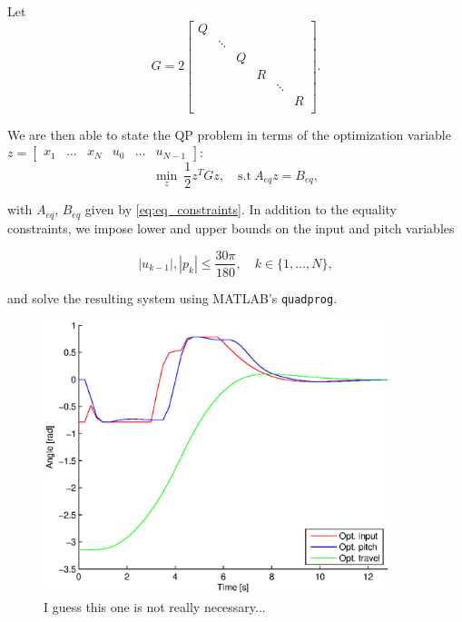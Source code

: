 Let 
\begin{equation*}
	G = 2
	\begin{bmatrix}
	Q	&&&&&		\\
		&\ddots&&&&	\\
		&&Q&&&		\\
		&&&R&&		\\
		&&&&\ddots&	\\
		&&&&&R		\\
	\end{bmatrix}.
\end{equation*}

 We are then able to state the QP problem in terms of the optimization variable $z = \begin{bmatrix} x_1 & \dots & x_N & u_0 & \dots & u_{N-1} \end{bmatrix}$:
\begin{equation*}
	\min_z \ \frac{1}{2} z^T G z, \quad \textrm{s.t}\ A_{eq} z = B_{eq},
\end{equation*}

with $A_{eq}$, $B_{eq}$ given by \eqref{eq:eq_constraints}. In addition to the equality constraints, we impose lower and upper bounds on the input and pitch variables

\begin{equation*}
	|u_{k-1}|, |p_k| \le \frac{30 \pi}{180}, \quad k \in \{1, \dots, N\},
\end{equation*}

and solve the resulting system using MATLAB's \texttt{quadprog}.

\begin{figure}[hp]
	\centering
		\includegraphics[width=0.9\textwidth]{figures/2/opt_traj.eps}
	\caption{I guess this one is not really necessary...}
	\label{fig:opt_traj}
\end{figure}

